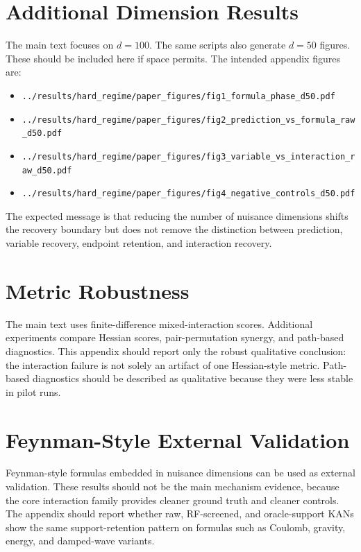 \documentclass[11pt]{article}
\begin{document}
\appendix

\section{Additional Dimension Results}

The main text focuses on $d=100$. The same scripts also generate $d=50$ figures. These should be included here if space permits. The intended appendix figures are:
\begin{itemize}
    \item \texttt{../results/hard\_regime/paper\_figures/fig1\_formula\_phase\_d50.pdf}
    \item \texttt{../results/hard\_regime/paper\_figures/fig2\_prediction\_vs\_formula\_raw\_d50.pdf}
    \item \texttt{../results/hard\_regime/paper\_figures/fig3\_variable\_vs\_interaction\_raw\_d50.pdf}
    \item \texttt{../results/hard\_regime/paper\_figures/fig4\_negative\_controls\_d50.pdf}
\end{itemize}
The expected message is that reducing the number of nuisance dimensions shifts the recovery boundary but does not remove the distinction between prediction, variable recovery, endpoint retention, and interaction recovery.

\section{Metric Robustness}

The main text uses finite-difference mixed-interaction scores. Additional experiments compare Hessian scores, pair-permutation synergy, and path-based diagnostics. This appendix should report only the robust qualitative conclusion: the interaction failure is not solely an artifact of one Hessian-style metric. Path-based diagnostics should be described as qualitative because they were less stable in pilot runs.

\section{Feynman-Style External Validation}

Feynman-style formulas embedded in nuisance dimensions can be used as external validation. These results should not be the main mechanism evidence, because the core interaction family provides cleaner ground truth and cleaner controls. The appendix should report whether raw, RF-screened, and oracle-support KANs show the same support-retention pattern on formulas such as Coulomb, gravity, energy, and damped-wave variants.
\end{document}
